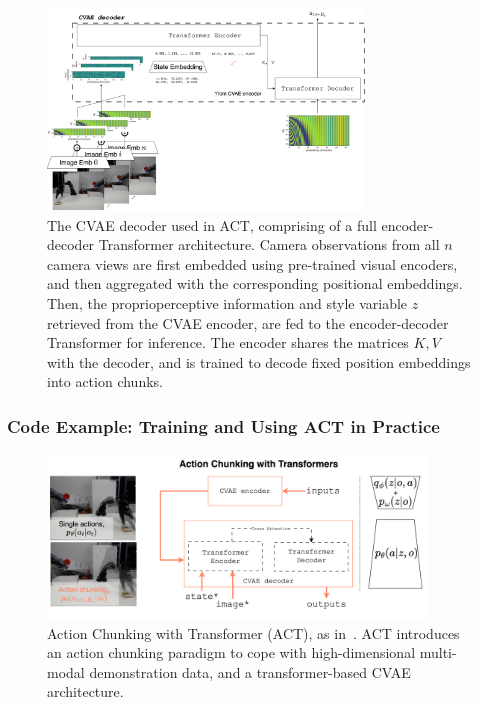 \begin{figure}
    \centering
    \includegraphics[width=0.75\textwidth]{figures/ch4/ch4-act-decoder.png}
    \caption{The CVAE decoder used in ACT, comprising of a full encoder-decoder Transformer architecture. Camera observations from all \( n \) camera views are first embedded using pre-trained visual encoders, and then aggregated with the corresponding positional embeddings. Then, the proprioperceptive information and style variable \( z \) retrieved from the CVAE encoder, are fed to the encoder-decoder Transformer for inference. The encoder shares the matrices \( K,V \) with the decoder, and is trained to decode fixed position embeddings into action chunks.}
    \label{fig:ch4-act-decoder}
\end{figure}

\subsubsection{Code Example: Training and Using ACT in Practice}

\begin{figure}
    \centering
    \includegraphics[width=0.9\textwidth]{figures/ch4/ch4-act.png}
    \caption{Action Chunking with Transformer (ACT), as in~\citet{zhaoLearningFineGrainedBimanual2023}. ACT introduces an action chunking paradigm to cope with high-dimensional multi-modal demonstration data, and a transformer-based CVAE architecture.}
    \label{fig:ch4-act}
\end{figure}

